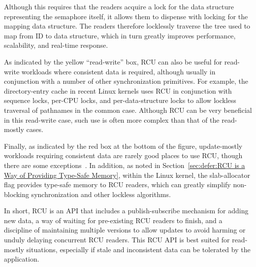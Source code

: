 Although this requires that the readers acquire a lock for the
data structure representing the semaphore itself,
it allows them to dispense with locking for the
mapping data structure.
The readers therefore locklessly
traverse the tree used to map from ID to data structure,
which in turn greatly improves performance, scalability, and
real-time response.

As indicated by the yellow ``read-write'' box, RCU can also be useful
for read-write
workloads where consistent data is required, although usually in
conjunction with a number of other synchronization primitives.
For example, the directory-entry cache in recent Linux kernels uses RCU in
conjunction with sequence locks, per-CPU locks, and per-data-structure
locks to allow lockless traversal of pathnames in the common case.
Although RCU can be very beneficial in this read-write case, such
use is often more complex than that of the read-mostly cases.

Finally, as indicated by the red box at the bottom of the figure,
update-mostly workloads requiring
consistent data are rarely good places to use RCU, though there are some
exceptions~\cite{MathieuDesnoyers2012URCU}.
In addition, as noted in
Section~\ref{sec:defer:RCU is a Way of Providing Type-Safe Memory},
within the Linux kernel, the 
slab-allocator flag provides type-safe memory to RCU readers, which can
greatly simplify non-blocking synchronization and other lockless
algorithms.

In short, RCU is an API that includes a publish-subscribe mechanism for
adding new data, a way of waiting for pre-existing RCU readers to finish,
and a discipline of maintaining multiple versions to allow updates to
avoid harming or unduly delaying concurrent RCU readers.
This RCU API is best suited for read-mostly situations, especially if
stale and inconsistent data can be tolerated by the application.

%
